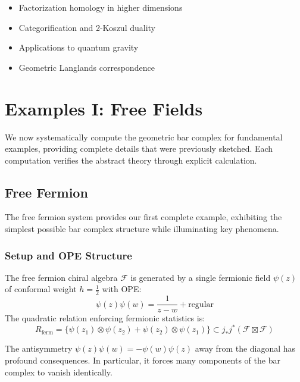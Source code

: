 \begin{remark}
\begin{itemize}
\item Factorization homology in higher dimensions
\item Categorification and 2-Koszul duality
\item Applications to quantum gravity
\item Geometric Langlands correspondence
\end{itemize}
\end{remark}

\section{Examples I: Free Fields}
 
We now systematically compute the geometric bar complex for fundamental examples, providing complete 
details that were previously sketched. Each computation verifies the abstract theory through explicit 
calculation.
 
\subsection{Free Fermion}
 
The free fermion system provides our first complete example, exhibiting the simplest possible bar complex 
structure while illuminating key phenomena.
 
\subsubsection{Setup and OPE Structure}
 
\begin{definition}
The free fermion chiral algebra $\mathcal{F}$ is generated by a single fermionic field $\psi(z)$ of 
conformal weight $h = \frac{1}{2}$ with OPE:
\[
\psi(z)\psi(w) = \frac{1}{z-w} + \text{regular}
\]
The quadratic relation enforcing fermionic statistics is:
\[
R_{\text{ferm}} = \{\psi(z_1) \otimes \psi(z_2) + \psi(z_2) \otimes \psi(z_1)\} \subset 
j_*j^*(\mathcal{F} \boxtimes \mathcal{F})
\]
\end{definition}
 
\begin{remark}
The antisymmetry $\psi(z)\psi(w) = -\psi(w)\psi(z)$ away from the diagonal has profound consequences. 
In particular, it forces many components of the bar complex to vanish identically.
\end{remark}
 
